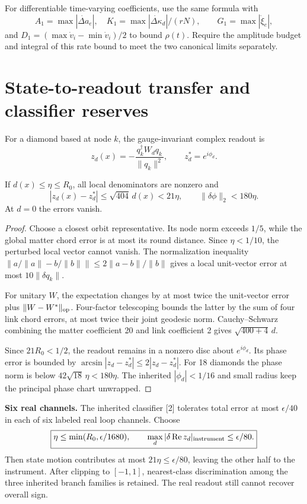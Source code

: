 \documentclass[11pt,a4paper]{article}
\begin{document}
For differentiable time-varying coefficients, use the same formula with
\[
A_1=\max|\dot{\Delta a}_e|,\quad K_1=\max|\dot{\Delta\kappa}_d|/(rN),
\qquad G_1=\max|\dot\xi_e|,
\]
and $D_1=(\max\dot v_i-\min\dot v_i)/2$ to bound $\rho(t)$. Require the amplitude budget and integral of this rate bound to meet the two canonical limits separately.
\newpage
\section{State-to-readout transfer and classifier reserves}
For a diamond based at node $k$, the gauge-invariant complex readout is
\[
z_d(x)=-\frac{q_k^\dagger W_dq_k}{\|q_k\|^2},\qquad z_d^*=e^{i\phi_d}.
\]
\begin{lemma}\label{lem:readout}
If $d(x)\le\eta\le R_0$, all local denominators are nonzero and
\[
|z_d(x)-z_d^*|\le\sqrt{404}\,d(x)<21\eta,\qquad
\|\delta\phi\|_2<180\eta.
\]
At $d=0$ the errors vanish.
\end{lemma}
\begin{proof}
Choose a closest orbit representative. Its node norm exceeds $1/5$, while the global matter chord error is at most its round distance. Since $\eta<1/10$, the perturbed local vector cannot vanish. The normalization inequality $\|a/\|a\|-b/\|b\|\|\le2\|a-b\|/\|b\|$ gives a local unit-vector error at most $10\|\delta q_k\|$.

For unitary $W$, the expectation changes by at most twice the unit-vector error plus $\|W-W^*\|_{\rm op}$. Four-factor telescoping bounds the latter by the sum of four link chord errors, at most twice their joint geodesic norm. Cauchy--Schwarz combining the matter coefficient 20 and link coefficient 2 gives $\sqrt{400+4}\,d$.

Since $21R_0<1/2$, the readout remains in a nonzero disc about $e^{i\phi_d}$. Its phase error is bounded by $\arcsin|z_d-z_d^*|\le2|z_d-z_d^*|$. For 18 diamonds the phase norm is below $42\sqrt{18}\,\eta<180\eta$. The inherited $|\phi_d|<1/16$ and small radius keep the principal phase chart unwrapped.
\end{proof}
\textbf{Six real channels.} The inherited classifier [2] tolerates total error at most $\epsilon/40$ in each of six labeled real loop channels. Choose
\[
\boxed{\eta\le\min(R_0,\epsilon/1680),\qquad
\max_d|\delta\operatorname{Re} z_d|_{\rm instrument}\le\epsilon/80.}
\]
Then state motion contributes at most $21\eta\le\epsilon/80$, leaving the other half to the instrument. After clipping to $[-1,1]$, nearest-class discrimination among the three inherited branch families is retained. The real readout still cannot recover overall sign.
\end{document}
